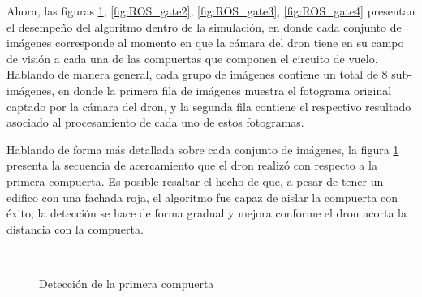 Ahora, las figuras \ref{fig:ROS_gate1}, \ref{fig:ROS_gate2}, \ref{fig:ROS_gate3}, \ref{fig:ROS_gate4} presentan el desempeño del algoritmo dentro de la simulación, en donde cada conjunto de imágenes corresponde al momento en que la cámara del dron tiene en su campo de visión a cada una de las compuertas que componen el circuito de vuelo. Hablando de manera general, cada grupo de imágenes contiene un total de 8 sub-imágenes, en donde la primera fila de imágenes muestra el fotograma original captado por la cámara del dron, y la segunda fila contiene el respectivo resultado asociado al procesamiento de cada uno de estos fotogramas.

Hablando de forma más detallada sobre cada conjunto de imágenes, la figura \ref{fig:ROS_gate1} presenta la secuencia de acercamiento que el dron realizó con respecto a la primera compuerta. Es posible resaltar el hecho de que, a pesar de tener un edifico con una fachada roja, el algoritmo fue capaz de aislar la compuerta con éxito; la detección se hace de forma gradual y mejora conforme el dron acorta la distancia con la compuerta.

\begin{figure}[ht]
    \centering
     \hspace{0.2 pt}
     \hspace{0.2 pt}
     \hspace{0.2 pt}
     \\
     \hspace{0.2 pt}
     \hspace{0.2 pt}
     \hspace{0.2 pt}
    
    \caption{Detección de la primera compuerta}
    \label{fig:ROS_gate1}
\end{figure}

